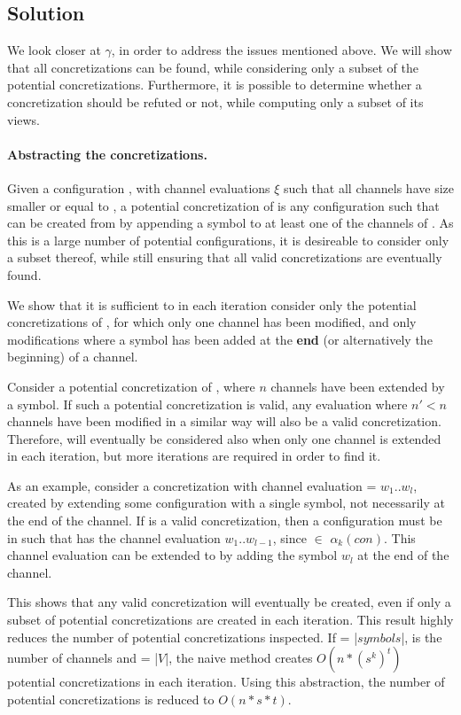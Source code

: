 \subsection{Solution}
We look closer at $\gamma$, in order to address the issues mentioned above. We will show that all concretizations can be found, while considering only a subset of the potential concretizations. Furthermore, it is possible to determine whether a concretization should be refuted or not, while computing only a subset of its views. 

\paragraph{Abstracting the concretizations.}
Given a configuration , with channel evaluations $\xi$ such that all channels have size smaller or equal to , a potential concretization of  is any configuration  such that  can be created from  by appending a symbol to at least one of the channels of . As this is a large number of potential configurations, it is desireable to consider only a subset thereof, while still ensuring that all valid concretizations are eventually found.

We show that it is sufficient to in each iteration consider only the potential concretizations of , for which only one channel has been modified, and only modifications where a symbol has been added at the \textbf{end} (or alternatively the beginning) of a channel.

Consider a potential concretization  of , where $n$ channels have been extended by a symbol. If such a potential concretization is valid, any evaluation where $n'<n$ channels have been modified in a similar way will also be a valid concretization. Therefore,  will eventually be considered also when only one channel is extended in each iteration, but more iterations are required in order to find it.

As an example, consider a concretization with channel evaluation  = $w_1..w_l$, created by extending some configuration with a single symbol, not necessarily at the end of the channel. If  is a valid concretization, then a configuration  must be in  such that  has the channel evaluation $w_1..w_{l-1}$, since  $\in$ $\alpha_k(con)$. This channel evaluation can be extended to  by adding the symbol $w_l$ at the end of the channel.

This shows that any valid concretization will eventually be created, even if only a subset of potential concretizations are created in each iteration. This result highly reduces the number of potential concretizations inspected. If  = |$symbols$|,  is the number of channels and  = |$V$|, the naive method creates $O(n*(s^k)^t)$ potential concretizations in each iteration. Using this abstraction, the number of potential concretizations is reduced to $O(n*s*t)$.

